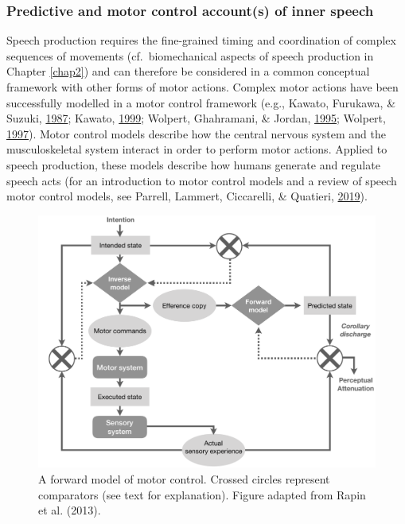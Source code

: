 \documentclass[a4paper,12pt,twoside,onecolumn,openright,final,oldfontcommands]{memoir}
\begin{document}
\hypertarget{predictive-and-motor-control-accounts-of-inner-speech}{%
\subsubsection{Predictive and motor control account(s) of inner speech}\label{predictive-and-motor-control-accounts-of-inner-speech}}

Speech production requires the fine-grained timing and coordination of complex sequences of movements (cf.~biomechanical aspects of speech production in Chapter \ref{chap2}) and can therefore be considered in a common conceptual framework with other forms of motor actions. Complex motor actions have been successfully modelled in a motor control framework (e.g., Kawato, Furukawa, \& Suzuki, \protect\hyperlink{ref-kawato_hierarchical_1987}{1987}; Kawato, \protect\hyperlink{ref-kawato_internal_1999}{1999}; Wolpert, Ghahramani, \& Jordan, \protect\hyperlink{ref-wolpert_internal_1995}{1995}; Wolpert, \protect\hyperlink{ref-wolpert_computational_1997}{1997}). Motor control models describe how the central nervous system and the musculoskeletal system interact in order to perform motor actions. Applied to speech production, these models describe how humans generate and regulate speech acts (for an introduction to motor control models and a review of speech motor control models, see Parrell, Lammert, Ciccarelli, \& Quatieri, \protect\hyperlink{ref-parrell_current_2019}{2019}).

\begin{figure}[ht]

{\centering \includegraphics[width=0.75\linewidth]{assets/motor_control} 

}

\caption{A forward model of motor control. Crossed circles represent comparators (see text for explanation). Figure adapted from Rapin et al. (2013).}\label{fig:motorcontrol}
\end{figure}
\end{document}
